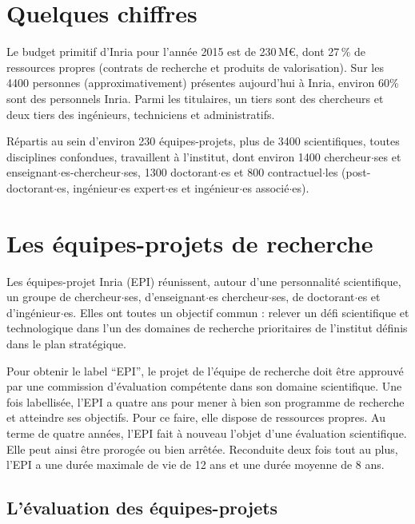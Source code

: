 \section{Quelques chiffres}

Le budget primitif d'Inria pour l'ann\'ee 2015 est de
230\,M\euro{}, dont 27\,\% de ressources propres (contrats de recherche
et produits de valorisation). Sur les 4400 personnes (approximativement) pr\'esentes aujourd'hui \`a
Inria, environ 60\% sont des personnels Inria. 
Parmi les titulaires, un tiers sont des chercheurs
et deux tiers des ing\'enieurs, techniciens et administratifs. 

R\'epartis au sein d'environ 230 \'equipes-projets, 
plus de 3400 scientifiques, toutes disciplines confondues,
travaillent \`a l'institut, 
dont environ 1400 chercheur$\cdot$ses et enseignant$\cdot$es-chercheur$\cdot$ses, 
1300 doctorant$\cdot$es et 800 contractuel$\cdot$les
(post-doctorant$\cdot$es, ing\'enieur$\cdot$es expert$\cdot$es et ing\'enieur$\cdot$es associ\'e$\cdot$es).


\section{Les \'equipes-projets de recherche}
\label{sec. projets INRIA}

Les \'equipes-projet Inria (EPI) r\'eunissent, autour d'une personnalit\'e scientifique, un groupe de chercheur$\cdot$ses, d'enseignant$\cdot$es chercheur$\cdot$ses, de doctorant$\cdot$es et d'ing\'enieur$\cdot$es. Elles ont toutes un objectif commun : relever un d\'efi scientifique et technologique dans l'un des domaines de recherche prioritaires de l'institut d\'efinis dans le plan strat\'egique.


Pour obtenir le label ``EPI'', le projet de l'\'equipe de recherche doit \^etre approuv\'e par une commission d'\'evaluation comp\'etente dans son domaine scientifique. Une fois labellis\'ee, l'EPI a quatre ans pour mener \`a bien son programme de recherche et atteindre ses objectifs. Pour ce faire, elle dispose de ressources propres. Au terme de quatre ann\'ees, l'EPI fait \`a nouveau l'objet d'une \'evaluation scientifique. Elle peut ainsi \^etre prorog\'ee ou bien arr\^et\'ee. Reconduite deux fois tout au plus, l'EPI a une dur\'ee maximale de vie de 12 ans et une dur\'ee moyenne de 8 ans.

\subsection*{L'\'evaluation des \'equipes-projets}

